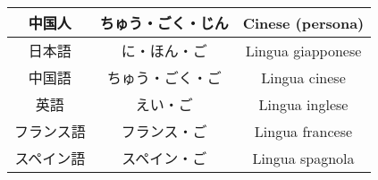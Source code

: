 \documentclass{article}
\let\ita\textitalian
\begin{document}
\begin{center}
\begin{japanese}
\begin{longtable}{|c|c|c|}
                \hline
                中国人 & ちゅう・ごく・じん & \ita{Cinese (persona)}\\
                \hline
                日本語 & に・ほん・ご & \ita{Lingua giapponese}\\
                \hline
                中国語 & ちゅう・ごく・ご & \ita{Lingua cinese}\\
                \hline
                英語 & えい・ご & \ita{Lingua inglese}\\
                \hline
                フランス語 & フランス・ご & \ita{Lingua francese}\\
                \hline
                スペイン語 & スペイン・ご & \ita{Lingua spagnola}\\
                \hline
            \end{longtable}
        \end{japanese}
    \end{center}
\end{document}
